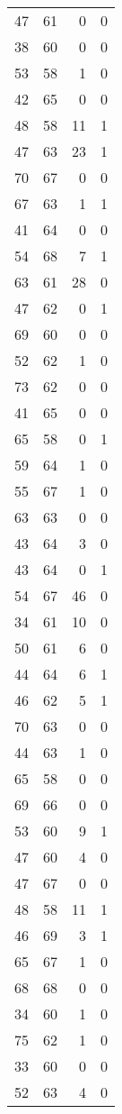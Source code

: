 \begin{tabular}{rrrr}
 47 &  61 &  0 &  0 \\
 38 &  60 &  0 &  0 \\
 53 &  58 &  1 &  0 \\
 42 &  65 &  0 &  0 \\
 48 &  58 & 11 &  1 \\
 47 &  63 & 23 &  1 \\
 70 &  67 &  0 &  0 \\
 67 &  63 &  1 &  1 \\
 41 &  64 &  0 &  0 \\
 54 &  68 &  7 &  1 \\
 63 &  61 & 28 &  0 \\
 47 &  62 &  0 &  1 \\
 69 &  60 &  0 &  0 \\
 52 &  62 &  1 &  0 \\
 73 &  62 &  0 &  0 \\
 41 &  65 &  0 &  0 \\
 65 &  58 &  0 &  1 \\
 59 &  64 &  1 &  0 \\
 55 &  67 &  1 &  0 \\
 63 &  63 &  0 &  0 \\
 43 &  64 &  3 &  0 \\
 43 &  64 &  0 &  1 \\
 54 &  67 & 46 &  0 \\
 34 &  61 & 10 &  0 \\
 50 &  61 &  6 &  0 \\
 44 &  64 &  6 &  1 \\
 46 &  62 &  5 &  1 \\
 70 &  63 &  0 &  0 \\
 44 &  63 &  1 &  0 \\
 65 &  58 &  0 &  0 \\
 69 &  66 &  0 &  0 \\
 53 &  60 &  9 &  1 \\
 47 &  60 &  4 &  0 \\
 47 &  67 &  0 &  0 \\
 48 &  58 & 11 &  1 \\
 46 &  69 &  3 &  1 \\
 65 &  67 &  1 &  0 \\
 68 &  68 &  0 &  0 \\
 34 &  60 &  1 &  0 \\
 75 &  62 &  1 &  0 \\
 33 &  60 &  0 &  0 \\
 52 &  63 &  4 &  0 \\

\end{tabular}
